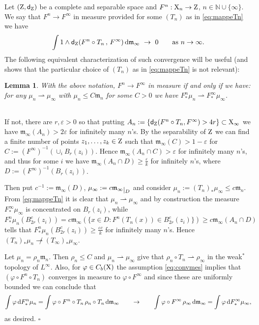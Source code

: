 \documentclass[11pt]{article}
\numberwithin{equation}{section}
\newtheorem{lemma}[theorem]{Lemma}
\newenvironment{idea}{\removelastskip\par\medskip   %
\noindent{\em Idea of the proof} \rm}{\penalty-20\null\hfill$\square$\par\medbreak}
\newcommand{\N}{\mathbb{N}}
\newcommand{\Z}{\mathbb{Z}}
\newcommand{\restr}[1]{\lower3pt\hbox{$|_{#1}$}}
\newcommand{\X}{{\rm X}}
\renewcommand{\Z}{{\rm Z}}
\newcommand{\sfd}{{\sf d}}
\newcommand{\mm}{{\mathfrak m}}
\renewcommand{\d}{{\rm d}}
\newcommand{\weakto}{\rightharpoonup}
\newcommand{\eps}{\varepsilon}
\begin{document}
Let  $(\Z,\sfd_\Z)$ be a complete and separable space and $F^n:\X_n\to\Z$, $n\in\N\cup\{\infty\}$. We say that $F^n\to F^\infty$ in measure provided for some $(T_n)$ as in \eqref{eq:mappeTn}  we have 
\begin{equation}
\label{eq:convmes}
 \int 1\wedge\sfd_\Z(F^n\circ T_n\,,\,F^\infty )\,\d\mm_\infty\ \to\ 0\qquad\text{as $n\to\infty$}.
\end{equation}
The following equivalent characterization of such convergence will be useful (and shows that the particular choice of $(T_n)$ as in \eqref{eq:mappeTn} is not relevant):
\begin{lemma}\label{le:criterioL0} With the above notation,  $F^n\to F^\infty$  in measure if and only if we have:  for any $\mu_n\weakto\mu_\infty$ with $\mu_n\leq C\mm_n$ for some $C>0$ we have $F^n_*\mu_n\weakto F^\infty_*\mu_\infty$.  
\end{lemma}
\begin{idea}\ \\
If not, there are $r,\eps>0$ so that putting $A_n:=\{\sfd_\Z(F^n\circ T_n,F^\infty)>4r\}\subset\X_\infty$ we have $\mm_\infty(A_n)>2\eps$ for infinitely many $n$'s. By the separability of $\Z$ we can find a finite number of points $z_1,\ldots,z_k\in\Z$ such that $\mm_\infty(C)>1-\eps$ for $C:=(F^\infty)^{-1}(\cup_iB_{r}(z_i))$. Hence $\mm_\infty(A_n\cap  C)>\eps$ for infinitely many $n$'s, and thus for some $i$ we have $\mm_\infty(A_n\cap D)\geq \frac\eps k$ for infinitely $n$'s, where $D:=(F^\infty)^{-1}(B_{r}(z_i))$. 

Then put $c^{-1}:=\mm_\infty(D)$,  $\mu_\infty:=c\mm_\infty\restr {D}$ and  consider $\mu_n:=(T_n)_*\mu_\infty\leq c\mm_n$. From \eqref{eq:mappeTn} it is clear that $\mu_n\weakto\mu_\infty$ and by construction  the measure $F^\infty_*\mu_\infty$ is concentrated on $B_r(z_i)$, while $F^n_*\mu_n(B_{2r}^c(z_i))=c\mm_\infty(\{x\in D:F^n(T_n(x))\in B_{2r}^c(z_i)\})\geq c\mm_\infty(A_n\cap D)$ tells that $F^n_*\mu_n(B_{2r}^c(z_i))\geq\tfrac{\eps c}k$ for infinitely many $n$'s. Hence  $(T_n)_*\mu_n\not\weakto (T_\infty)_*\mu_\infty$.

 Let $\mu_n=\rho_n\mm_n$. Then $\rho_n\leq C$ and $\mu_n\weakto \mu_\infty$ give that $\rho_n\circ T_n\weakto \rho_\infty$ in the weak$^*$ topology of $L^\infty$. Also, for $\varphi\in C_b(\X)$ the assumption  \eqref{eq:convmes} implies that $(\varphi\circ F^n\circ T_n)$ converges in measure to $\varphi\circ F^\infty$ and since these are uniformly bounded we can conclude that 
\[
\int\varphi\,\d F^n_*\mu_n=\int \varphi\circ F^n\circ T_n\,\rho_n\circ T_n\,\d\mm_\infty\qquad\to\qquad \int \varphi\circ F^\infty\,\rho_\infty\,\d\mm_\infty =\int\varphi\,\d F^\infty_*\mu_\infty,
\]
as desired.
 \end{idea}
\end{document}
